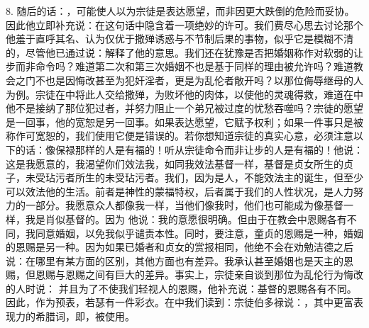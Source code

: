 8. 随后的话：，可能使人以为宗徒是表达愿望，而非因更大跌倒的危险而妥协。因此他立即补充说：在这句话中隐含着一项绝妙的许可。我们费尽心思去讨论那个他羞于直呼其名、认为仅优于撒殚诱惑与不节制后果的事物，似乎它是模糊不清的，尽管他已通过说：解释了他的意思。我们还在犹豫是否把婚姻称作对软弱的让步而非命令吗？难道第二次和第三次婚姻不也是基于同样的理由被允许吗？难道教会之门不也是因悔改甚至为犯奸淫者，更是为乱伦者敞开吗？以那位侮辱继母的人为例。宗徒在中将此人交给撒殚，为败坏他的肉体，以使他的灵魂得救，难道在中他不是接纳了那位犯过者，并努力阻止一个弟兄被过度的忧愁吞噬吗？宗徒的愿望是一回事，他的宽恕是另一回事。如果表达愿望，它赋予权利；如果一件事只是被称作可宽恕的，我们使用它便是错误的。若你想知道宗徒的真实心意，必须注意以下的话：像保禄那样的人是有福的！听从宗徒命令而非让步的人是有福的！他说：这是我愿意的，我渴望你们效法我，如同我效法基督一样，基督是贞女所生的贞子，未受玷污者所生的未受玷污者。我们，因为是人，不能效法主的诞生，但至少可以效法他的生活。前者是神性的蒙福特权，后者属于我们的人性状况，是人力努力的一部分。我愿意众人都像我一样，当他们像我时，他们也可能成为像基督一样，我是肖似基督的。因为  他说：我的意愿很明确。但由于在教会中恩赐各有不同，我同意婚姻，以免我似乎谴责本性。同时，要注意，童贞的恩赐是一种，婚姻的恩赐是另一种。因为如果已婚者和贞女的赏报相同，他绝不会在劝勉洁德之后说：在哪里有某方面的区别，其他方面也有差异。我承认甚至婚姻也是天主的恩赐，但恩赐与恩赐之间有巨大的差异。事实上，宗徒亲自谈到那位为乱伦行为悔改的人时说： 并且为了不使我们轻视人的恩赐，他补充说：基督的恩赐各有不同。因此，作为预表，若瑟有一件彩衣。在中我们读到：宗徒伯多禄说：，其中更富表现力的希腊词，即，被使用。\par

